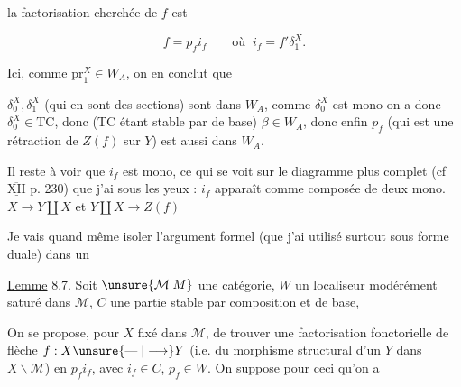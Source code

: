 
la factorisation cherchée de $f$ est

\[
f=p_f i_f\qquad\text{où }\ i_f=f'\delta_1^X .
\]

Ici, comme $\mathrm{pr}_1^X\in W_A$, on en conclut que

$\delta_0^X,\delta_1^X$ (qui en sont des sections) sont dans $W_A$, comme $\delta_0^X$ est mono on a donc $\delta_0^X\in\mathrm{TC}$, donc ($\mathrm{TC}$ étant stable par  de base) $\beta\in W_A$, donc enfin $p_f$ (qui est une rétraction de $Z(f)$ sur $Y$) est aussi dans $W_A$.

Il reste à voir que $i_f$ est mono, ce qui se voit sur le diagramme plus complet (cf $\overline{\underline{\mathrm{XII}}}$ p. 230\deleted{\unsure{)}}) que j'ai sous les yeux : $i_f$ apparaît comme composée de deux mono. $X\longrightarrow Y\amalg X$ et $Y\amalg X\longrightarrow Z(f)$


 Je vais quand même isoler l'argument formel  (que j'ai utilisé surtout sous forme duale) dans un

\uline{Lemme} 8.7. Soit $\unsure{\mathcal{M}|M}$ une catégorie, $W$ un localiseur modérément saturé dans $\mathcal{M}$, $C$ une partie stable par composition et   de base,

On se propose, pour $X$ fixé dans $\mathcal{M}$, de trouver une factorisation fonctorielle de  flèche $f:X\unsure{\mathrel{\text{---}}|\longrightarrow}Y$ (i.e. du morphisme structural d'un $Y$ dans $X\backslash\mathcal{M}$) en $p_f i_f$, avec $i_f\in C$, $p_f\in W$. On suppose  pour ceci qu'on a

